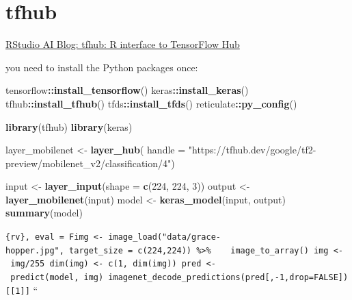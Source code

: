 \documentclass[]{book}
\newenvironment{Shaded}{\begin{snugshade}}{\end{snugshade}}
\newcommand{\DataTypeTok}[1]{\textcolor[rgb]{0.13,0.29,0.53}{#1}}
\newcommand{\DecValTok}[1]{\textcolor[rgb]{0.00,0.00,0.81}{#1}}
\newcommand{\KeywordTok}[1]{\textcolor[rgb]{0.13,0.29,0.53}{\textbf{#1}}}
\newcommand{\NormalTok}[1]{#1}
\newcommand{\OperatorTok}[1]{\textcolor[rgb]{0.81,0.36,0.00}{\textbf{#1}}}
\newcommand{\StringTok}[1]{\textcolor[rgb]{0.31,0.60,0.02}{#1}}
\begin{document}
\hypertarget{tfhub}{%
\section{tfhub}\label{tfhub}}

\href{https://blogs.rstudio.com/ai/posts/2019-12-18-tfhub-0.7.0/}{RStudio AI Blog: tfhub: R interface to TensorFlow Hub}

you need to install the Python packages once:

\begin{Shaded}
\begin{Highlighting}[]
\NormalTok{tensorflow}\OperatorTok{::}\KeywordTok{install_tensorflow}\NormalTok{()}
\NormalTok{keras}\OperatorTok{::}\KeywordTok{install_keras}\NormalTok{()}
\NormalTok{tfhub}\OperatorTok{::}\KeywordTok{install_tfhub}\NormalTok{()}
\NormalTok{tfds}\OperatorTok{::}\KeywordTok{install_tfds}\NormalTok{()}
\NormalTok{reticulate}\OperatorTok{::}\KeywordTok{py_config}\NormalTok{()}
\end{Highlighting}
\end{Shaded}

\begin{Shaded}
\begin{Highlighting}[]
\KeywordTok{library}\NormalTok{(tfhub)}
\KeywordTok{library}\NormalTok{(keras)}

\NormalTok{layer_mobilenet <-}\StringTok{ }\KeywordTok{layer_hub}\NormalTok{(}
  \DataTypeTok{handle =} \StringTok{"https://tfhub.dev/google/tf2-preview/mobilenet_v2/classification/4"}\NormalTok{)}

\NormalTok{input <-}\StringTok{ }\KeywordTok{layer_input}\NormalTok{(}\DataTypeTok{shape =} \KeywordTok{c}\NormalTok{(}\DecValTok{224}\NormalTok{, }\DecValTok{224}\NormalTok{, }\DecValTok{3}\NormalTok{))}
\NormalTok{output <-}\StringTok{ }\KeywordTok{layer_mobilenet}\NormalTok{(input)}
\NormalTok{model <-}\StringTok{ }\KeywordTok{keras_model}\NormalTok{(input, output)}
\KeywordTok{summary}\NormalTok{(model)}
\end{Highlighting}
\end{Shaded}

\texttt{\{rv\},\ eval\ =\ Fimg\ \textless{}-\ image\_load("data/grace-hopper.jpg",\ target\_size\ =\ c(224,224))\ \%\textgreater{}\%\ \ \ \ image\_to\_array()\ img\ \textless{}-\ img/255\ dim(img)\ \textless{}-\ c(1,\ dim(img))\ pred\ \textless{}-\ predict(model,\ img)\ imagenet\_decode\_predictions(pred{[},-1,drop=FALSE{]}){[}{[}1{]}{]}}
``


\end{document}
